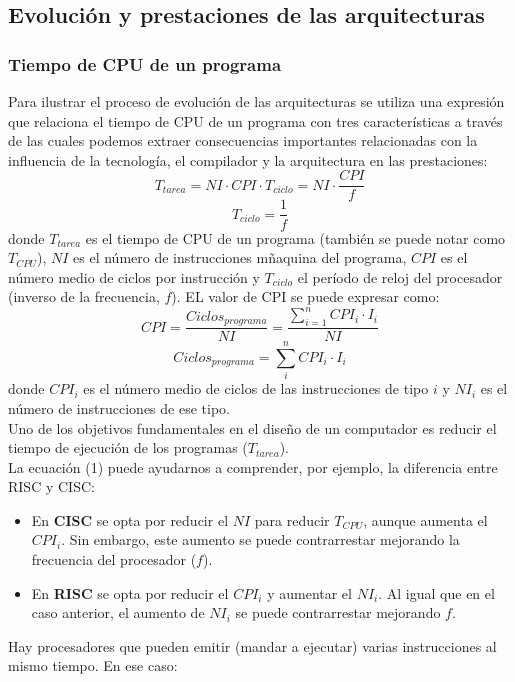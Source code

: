 \documentclass[12pt,spanish]{article}
\begin{document}
\subsection{Evolución y prestaciones de las arquitecturas}
\subsubsection{Tiempo de CPU de un programa}
Para ilustrar el proceso de evolución de las arquitecturas se utiliza una expresión que relaciona el tiempo de CPU de un programa con tres características a través de las cuales podemos extraer consecuencias importantes relacionadas con la influencia de la tecnología, el compilador y la arquitectura en las prestaciones:
\begin{equation}
T_{tarea}=NI \cdot CPI \cdot T_{ciclo}=NI \cdot \frac{CPI}{f}
\end{equation}
\[
T_{ciclo}=\frac{1}{f}
\]
donde $T_{tarea}$ es el tiempo de CPU de un programa (también se puede notar como $T_{CPU}$), $NI$ es el número de instrucciones mñaquina del programa, $CPI$ es el número medio de ciclos por instrucción y $T_{ciclo}$ el período de reloj del procesador (inverso de la frecuencia, $f$). EL valor de CPI se puede expresar como:
\newpage
\begin{equation}
CPI=\frac{Ciclos_{programa}}{NI}=\frac{\sum_{i=1}^{n} CPI_{i} \cdot I_i}{NI}
\end{equation}
\[
Ciclos_{programa}=\sum_{i}^{n}CPI_i \cdot I_i
\]
donde $CPI_{i}$ es el número medio de ciclos de las instrucciones de tipo $i$ y $NI_{i}$ es el número de instrucciones de ese tipo.\\
Uno de los objetivos fundamentales en el diseño de un computador es reducir el tiempo de ejecución de los programas ($T_{tarea}$).\\
La ecuación (1) puede ayudarnos a comprender, por ejemplo, la diferencia entre RISC y CISC:
\begin{itemize}
\item En \textbf{CISC} se opta por reducir el $NI$ para reducir $T_{CPU}$, aunque aumenta el $CPI_i$. Sin embargo, este aumento se puede contrarrestar mejorando la frecuencia del procesador ($f$).
\item En \textbf{RISC} se opta por reducir el $CPI_i$ y aumentar el $NI_i$. Al igual que en el caso anterior, el aumento de $NI_i$ se puede contrarrestar mejorando $f$.
\end{itemize}
Hay procesadores que pueden emitir (mandar a ejecutar) varias instrucciones al mismo tiempo. En ese caso:
\end{document}
